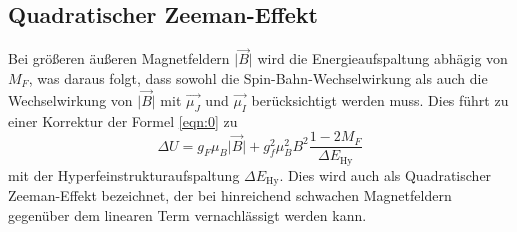 \subsection{Quadratischer Zeeman-Effekt}
Bei größeren äußeren Magnetfeldern $\lvert \vec{B} \rvert$ wird die Energieaufspaltung abhägig von $M_F$, was daraus folgt, dass sowohl die Spin-Bahn-Wechselwirkung als auch die Wechselwirkung von $\lvert \vec{B} \rvert$ mit $\vec{ \mu_J}$ und $\vec{ \mu_I}$ berücksichtigt werden muss.
Dies führt zu einer Korrektur der Formel \eqref{eqn:0} zu
\begin{equation}
  \label{eqn:zee}
  \Delta U = g_F \mu_B \lvert \vec{B} \rvert + g_f^2 \mu_B ^2 B^2 \frac{1 - 2 M_F}{\Delta E_\text{Hy}}
\end{equation}
mit der Hyperfeinstrukturaufspaltung $\Delta E_\text{Hy}$.
Dies wird auch als Quadratischer Zeeman-Effekt bezeichnet, der bei hinreichend schwachen Magnetfeldern gegenüber dem linearen Term vernachlässigt werden kann.



